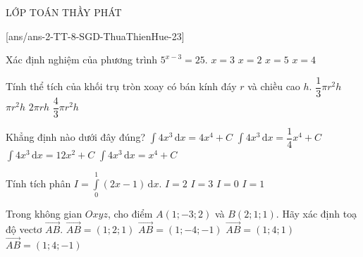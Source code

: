 \begin{name}
	{\tenchude}{\tendethi}{LỚP TOÁN THẦY PHÁT}{\thoigian}
\end{name}
\setcounter{ex}{0}\setcounter{bt}{0}
[ans/ans-2-TT-8-SGD-ThuaThienHue-23]
\begin{ex}%
	Xác định nghiệm của phương trình $5^{x-3}=25$.
	\choice
	{$x=3$}
	{$x=2$}
	{\True $x=5$}
	{$x=4$}
\end{ex}
\begin{ex}%
	Tính thể tích của khối trụ tròn xoay có bán kính đáy $r$ và chiều cao $h$.
	\choice
	{$\dfrac{1}{3}\pi r^2 h$}
	{\True $\pi r^2 h$}
	{$2\pi r h$}
	{$\dfrac{4}{3} \pi r^2 h$}
\end{ex}
\begin{ex}%
	Khẳng định nào dưới đây đúng?
	\choice
	{$\displaystyle\int 4x^3 \mathrm{\,d}x=4x^4+C$}
	{$\displaystyle\int 4x^3 \mathrm{\,d}x=\dfrac{1}{4}x^4+C$}
	{$\displaystyle\int 4x^3 \mathrm{\,d}x=12x^2+C$}
	{\True $\displaystyle\int 4x^3 \mathrm{\,d}x=x^4+C$}
\end{ex}
\begin{ex}%
	Tính tích phân $I=\displaystyle\int\limits_0^1(2x-1) \mathrm{\,d}x$.
	\choice
	{$I=2$}
	{$I=3$}
	{\True $I=0$}
	{$I=1$}
\end{ex}
\begin{ex}%
	Trong không gian $Oxyz$, cho điểm $A(1;-3;2)$ và $B(2;1;1)$. Hãy xác định toạ độ vectơ $\overrightarrow{AB}$.
	\choice
	{$\overrightarrow{AB}=(1;2;1)$}
	{$\overrightarrow{AB}=(1;-4;-1)$}
	{$\overrightarrow{AB}=(1;4;1)$}
	{\True $\overrightarrow{AB}=(1;4;-1)$}
\end{ex}
